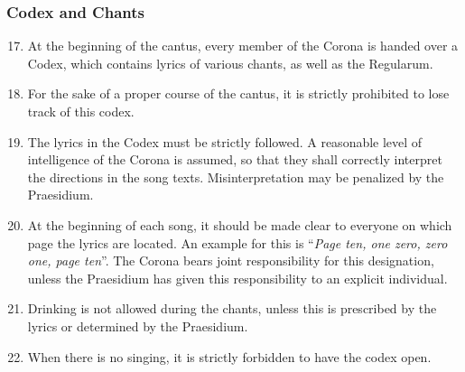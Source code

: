 \subsubsection*{Codex and Chants}
\begin{enumerate}
    \setcounter{enumi}{16}
    \item At the beginning of the cantus, every member of the Corona is handed over a Codex, which contains lyrics of various chants, as well as the Regularum.
    \item For the sake of a proper course of the cantus, it is strictly prohibited to lose track of this codex.
    \item The lyrics in the Codex must be strictly followed. A reasonable level of intelligence of the Corona is assumed, so that they shall correctly interpret the directions in the song texts. Misinterpretation may be penalized by the Praesidium.
    \item At the beginning of each song, it should be made clear to everyone on which page the lyrics are located. An example for this is ``\textit{Page ten, one zero, zero one, page ten}''. The Corona bears joint responsibility for this designation, unless the Praesidium has given this responsibility to an explicit individual.
    \item Drinking is not allowed during the chants, unless this is prescribed by the lyrics or determined by the Praesidium.
    \item When there is no singing, it is strictly forbidden to have the codex open.
\end{enumerate}


